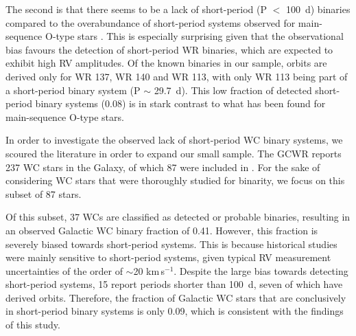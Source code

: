 The second is that there seems to be a lack of short-period (P $<$ 100~d) binaries compared to the overabundance of short-period systems observed for main-sequence O-type stars \citep[][]{sana_binary_2012}. This is especially surprising given that the observational bias favours the detection of short-period WR binaries, which are expected to exhibit high RV amplitudes. Of the known binaries in our sample, orbits are derived only for WR 137, WR 140 and WR 113, with only WR 113 being part of a short-period binary system (P $\sim$ 29.7~d). This low fraction of detected short-period binary systems (0.08) is in stark contrast to what has been found for main-sequence O-type stars.

In order to investigate the observed lack of short-period WC binary systems, we scoured the literature in order to expand our small sample. The GCWR reports 237 WC stars in the Galaxy, of which 87 were included in . For the sake of considering WC stars that were thoroughly studied for binarity, we focus on this subset of 87 stars.

Of this subset, 37 WCs are classified as detected or probable binaries, resulting in an observed Galactic WC binary fraction of 0.41. However, this fraction is severely biased towards short-period systems. This is because historical studies were mainly sensitive to short-period systems, given typical RV measurement uncertainties of the order of ${\sim}$20 km\,s$^{-1}$. Despite the large bias towards detecting short-period systems, 15 report periods shorter than 100~d, seven of which have derived orbits. Therefore, the fraction of Galactic WC stars that are conclusively in short-period binary systems is only 0.09, which is consistent with the findings of this study.

